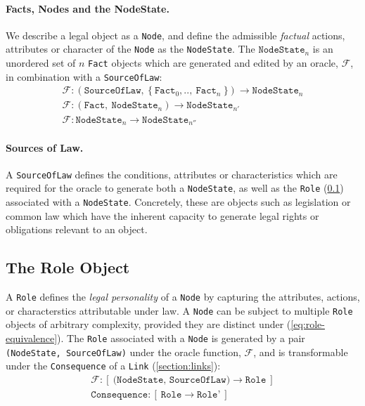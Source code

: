 \documentclass{article}
\numberwithin{equation}{section}
\begin{document}

\paragraph{Facts, Nodes and the NodeState.} We describe a legal object as a \texttt{Node}, and define the admissible \textit{factual} actions, attributes or character of the \texttt{Node} as the \texttt{NodeState}. The $\texttt{NodeState}_n$ is an unordered set of $n$  \texttt{Fact} objects which are generated and edited by an oracle, $\mathcal{F}$, in combination with a \texttt{SourceOfLaw}: %
\begin{align}
	\mathcal{F}: (\texttt{SourceOfLaw}, \ \{ \ \texttt{Fact}_0, .., \ \texttt{Fact}_n \ \}) \rightarrow \texttt{NodeState}_n \\
	\mathcal{F}: (\texttt{Fact}, \ \texttt{NodeState}_n) \rightarrow \texttt{NodeState}_{n'} \\
	\mathcal{F}: \texttt{NodeState}_n \rightarrow \texttt{NodeState}_{n''}
\end{align}

\paragraph{Sources of Law.} A \texttt{SourceOfLaw} defines the conditions, attributes or characteristics which are required for the oracle to generate both a \texttt{NodeState}, as well as the \texttt{Role} (\ref{section:role-object}) associated with a \texttt{NodeState}. Concretely, these are objects such as legislation or common law which have the inherent capacity to generate legal rights or obligations relevant to an object.


\subsection{The Role Object} \label{section:role-object}

A \texttt{Role} defines the \textit{legal personality} of a \texttt{Node} by capturing the attributes, actions, or characterstics attributable under law. A \texttt{Node} can be subject to multiple \texttt{Role} objects of arbitrary complexity, provided they are distinct under (\ref{eq:role-equivalence}). The \texttt{Role} associated with a \texttt{Node} is generated by a pair \texttt{(NodeState, SourceOfLaw)} under the oracle function, $\mathcal{F}$, and is transformable under the \texttt{Consequence} of a \texttt{Link} (\ref{section:links}): 
\begin{align}	
	\mathcal{F} : [ \ \texttt{(NodeState, SourceOfLaw)} \rightarrow \texttt{Role} \ ] \\
	\texttt{Consequence} : [ \ \texttt{Role} \rightarrow \texttt{Role'} \ ]
\end{align}
\end{document}
